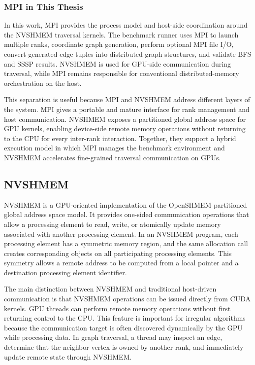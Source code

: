 \documentclass{article}
\begin{document}
\subsubsection*{MPI in This Thesis}

In this work, MPI provides the process model and host-side coordination around the NVSHMEM traversal kernels. The benchmark runner uses MPI to launch multiple ranks, coordinate graph generation, perform optional MPI file I/O, convert generated edge tuples into distributed graph structures, and validate BFS and SSSP results. NVSHMEM is used for GPU-side communication during traversal, while MPI remains responsible for conventional distributed-memory orchestration on the host.

This separation is useful because MPI and NVSHMEM address different layers of the system. MPI gives a portable and mature interface for rank management and host communication. NVSHMEM exposes a partitioned global address space for GPU kernels, enabling device-side remote memory operations without returning to the CPU for every inter-rank interaction. Together, they support a hybrid execution model in which MPI manages the benchmark environment and NVSHMEM accelerates fine-grained traversal communication on GPUs.

\subsection{NVSHMEM}

NVSHMEM is a GPU-oriented implementation of the OpenSHMEM partitioned global address space model. It provides one-sided communication operations that allow a processing element to read, write, or atomically update memory associated with another processing element. In an NVSHMEM program, each processing element has a symmetric memory region, and the same allocation call creates corresponding objects on all participating processing elements. This symmetry allows a remote address to be computed from a local pointer and a destination processing element identifier.

The main distinction between NVSHMEM and traditional host-driven communication is that NVSHMEM operations can be issued directly from CUDA kernels. GPU threads can perform remote memory operations without first returning control to the CPU. This feature is important for irregular algorithms because the communication target is often discovered dynamically by the GPU while processing data. In graph traversal, a thread may inspect an edge, determine that the neighbor vertex is owned by another rank, and immediately update remote state through NVSHMEM.
\end{document}
